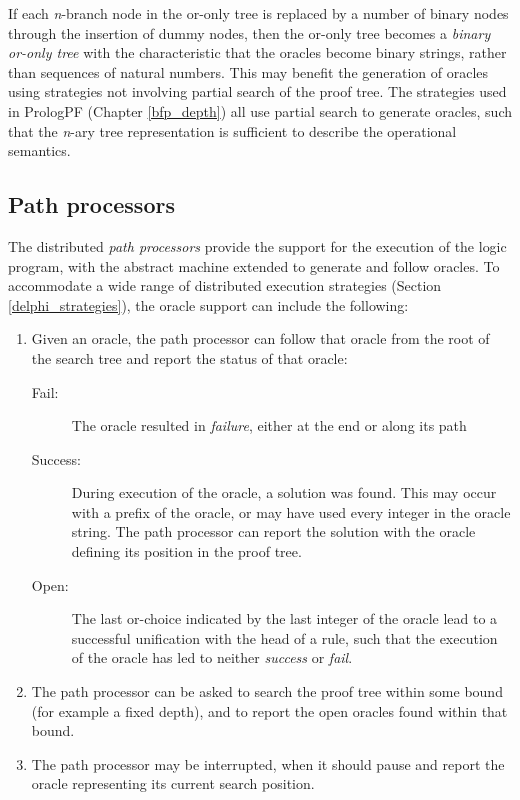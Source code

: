 If each \textit{n}-branch node in the or-only tree is replaced by a
number of binary nodes through the insertion of dummy nodes, then the
or-only tree becomes a \textit{binary or-only tree} with the characteristic
that the oracles become binary strings, rather than sequences of natural numbers.
This may benefit the generation of oracles using strategies not involving
partial search of the proof tree.  The strategies used in PrologPF (Chapter
\ref{bfp_depth}) all use partial search to generate oracles, such that
the \textit{n}-ary tree representation is sufficient to describe the
operational semantics.
 
\subsection{Path processors}
\label{path_processors}

The distributed \textit{path processors} provide the support for the execution of
the logic program, with the abstract machine extended to generate and
follow oracles.  To accommodate a wide range of distributed execution
strategies (Section \ref{delphi_strategies}), the oracle support can
include the following:

\begin{enumerate}
\item{Given an oracle, the path processor can follow that oracle from the
  root of the search tree and report the status of that oracle:
  \begin{description}
  \item[Fail:]{The oracle resulted in  \textit{failure}, either at the end or along 
    its path}
  \item[Success:]{During execution of the oracle, a solution was found.
    This may occur with a prefix of the oracle, or may have
    used every integer in the oracle string.  The path processor can
    report the solution with the oracle defining its position in the
    proof tree.}
  \item[Open:]{The last or-choice indicated by the last integer of the
    oracle lead to a successful unification with the head of a rule, such
    that the execution of the oracle has led to neither \textit{success}
    or \textit{fail}.}
  \end{description}}
\item{The path processor can be asked to search the proof tree within some
  bound (for example a fixed depth), and to report the open oracles found
  within that bound.}
\item{The path processor may be interrupted, when it should pause and report
  the oracle representing its current search position.}
\end{enumerate}

